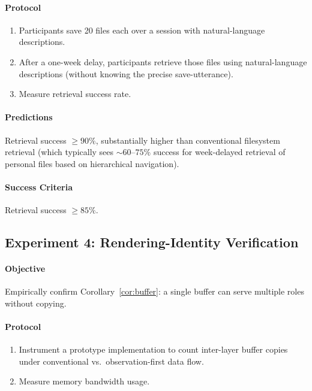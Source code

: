 \documentclass[11pt,twocolumn,a4paper]{article}
\theoremstyle{definition}
\theoremstyle{remark}
\begin{document}
\paragraph{Protocol}
\begin{enumerate}
    \item Participants save 20 files each over a session with natural-language descriptions.
    \item After a one-week delay, participants retrieve those files using natural-language descriptions (without knowing the precise save-utterance).
    \item Measure retrieval success rate.
\end{enumerate}

\paragraph{Predictions}
Retrieval success $\geq 90\%$, substantially higher than conventional filesystem retrieval (which typically sees $\sim 60$--$75\%$ success for week-delayed retrieval of personal files based on hierarchical navigation).

\paragraph{Success Criteria}
Retrieval success $\geq 85\%$.

\subsection{Experiment 4: Rendering-Identity Verification}

\paragraph{Objective} Empirically confirm Corollary~\ref{cor:buffer}: a single buffer can serve multiple roles without copying.

\paragraph{Protocol}
\begin{enumerate}
    \item Instrument a prototype implementation to count inter-layer buffer copies under conventional vs.\ observation-first data flow.
    \item Measure memory bandwidth usage.
\end{enumerate}
\end{document}
